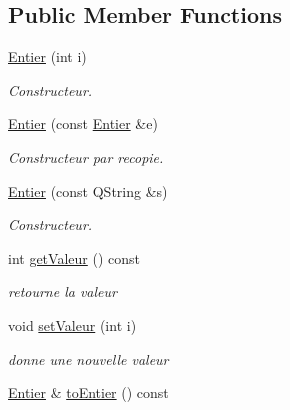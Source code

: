 \subsection*{Public Member Functions}
\begin{DoxyCompactItemize}
\item 
\hyperlink{classNombre_1_1Entier_aba1baf196e52fb9ea0398e5c5695bf61}{Entier} (int i)
\begin{DoxyCompactList}\small\item\em Constructeur. \item\end{DoxyCompactList}\item 
\hyperlink{classNombre_1_1Entier_a15923a12f9ef441d981f7c8b0977d233}{Entier} (const \hyperlink{classNombre_1_1Entier}{Entier} \&e)
\begin{DoxyCompactList}\small\item\em Constructeur par recopie. \item\end{DoxyCompactList}\item 
\hyperlink{classNombre_1_1Entier_ae18e68f53e56a1ed8e951cb43b7b34d1}{Entier} (const QString \&s)
\begin{DoxyCompactList}\small\item\em Constructeur. \item\end{DoxyCompactList}\item 
\hypertarget{classNombre_1_1Entier_a77282a0f57f0bdaecb5abceab8ad38d1}{
int \hyperlink{classNombre_1_1Entier_a77282a0f57f0bdaecb5abceab8ad38d1}{getValeur} () const }
\label{classNombre_1_1Entier_a77282a0f57f0bdaecb5abceab8ad38d1}

\begin{DoxyCompactList}\small\item\em retourne la valeur \item\end{DoxyCompactList}\item 
void \hyperlink{classNombre_1_1Entier_a434f40deb776ef9f128629095d130bf2}{setValeur} (int i)
\begin{DoxyCompactList}\small\item\em donne une nouvelle valeur \item\end{DoxyCompactList}\item 
\hypertarget{classNombre_1_1Entier_ad2ad3a58c27c2a288f0879eac1f3d73d}{
\hyperlink{classNombre_1_1Entier}{Entier} \& \hyperlink{classNombre_1_1Entier_ad2ad3a58c27c2a288f0879eac1f3d73d}{toEntier} () const }
\label{classNombre_1_1Entier_ad2ad3a58c27c2a288f0879eac1f3d73d}


\end{DoxyCompactItemize}
